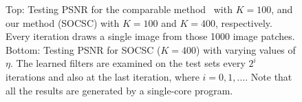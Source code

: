 \begin{figure}[h]
\caption{Top: Testing PSNR for the comparable method~\cite{liu-2018-first} with $K=100$, and our method (SOCSC) with $K=100$ and $K=400$, respectively. Every iteration draws a single image from those 1000 image patches. Bottom: Testing PSNR for SOCSC ($K=400$) with varying values of $\eta$. The learned filters are examined on the test sets every $2^i$ iterations and also at the last iteration, where $i=0,1,\dots$. Note that all the results are generated by a single-core program.}
\label{fig:overComDicAndMinibatch}
\end{figure} 